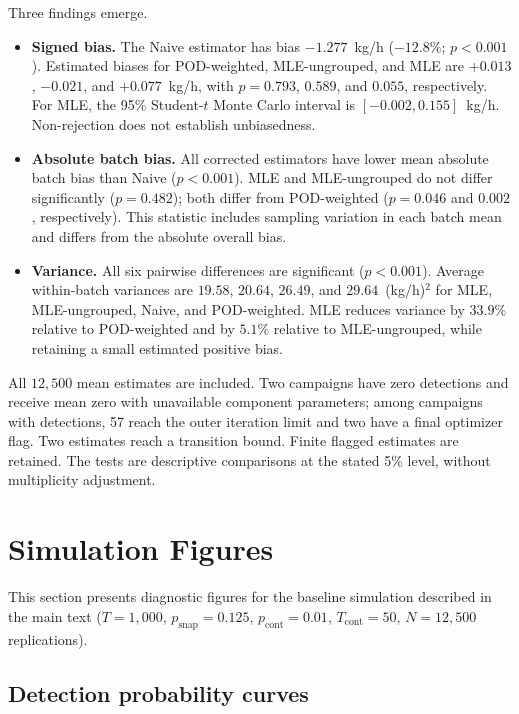 \documentclass[11pt]{article}
\newcommand{\new}[1]{#1}
\newcommand{\edit}[1]{#1}
\begin{document}
\new{Three findings emerge.
\begin{itemize}
    \item \textbf{Signed bias.} The Naive estimator has bias $-1.277$~kg/h ($-12.8\%$; $p<0.001$). Estimated biases for POD-weighted, MLE-ungrouped, and MLE are $+0.013$, $-0.021$, and $+0.077$~kg/h, with $p=0.793$, $0.589$, and $0.055$, respectively. For MLE, the 95\% Student-$t$ Monte Carlo interval is $[-0.002,0.155]$~kg/h. Non-rejection does not establish unbiasedness.
    \item \textbf{Absolute batch bias.} All corrected estimators have lower mean absolute batch bias than Naive ($p<0.001$). MLE and MLE-ungrouped do not differ significantly ($p=0.482$); both differ from POD-weighted ($p=0.046$ and $0.002$, respectively). This statistic includes sampling variation in each batch mean and differs from the absolute overall bias.
    \item \textbf{Variance.} All six pairwise differences are significant ($p<0.001$). Average within-batch variances are $19.58$, $20.64$, $26.49$, and $29.64$~(kg/h)$^2$ for MLE, MLE-ungrouped, Naive, and POD-weighted. MLE reduces variance by $33.9\%$ relative to POD-weighted and by $5.1\%$ relative to MLE-ungrouped, while retaining a small estimated positive bias.
\end{itemize}
All $12{,}500$ mean estimates are included. Two campaigns have zero detections and receive mean zero with unavailable component parameters; among campaigns with detections, 57 reach the outer iteration limit and two have a final optimizer flag. Two estimates reach a transition bound. Finite flagged estimates are retained. The tests are descriptive comparisons at the stated 5\% level, without multiplicity adjustment.}

\section{Simulation Figures}
\label{sec:sim_figures}

This section presents diagnostic figures for the baseline simulation described in the main text (\edit{$T = 1{,}000$, $p_{\text{snap}} = 0.125$, $p_{\text{cont}} = 0.01$, $T_{\text{cont}} = 50$, $N = 12{,}500$ replications}).

\subsection{Detection probability curves}
\end{document}
